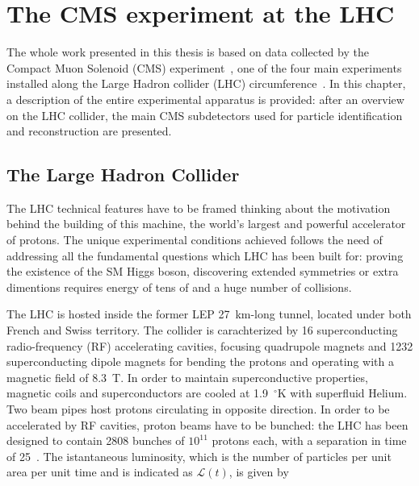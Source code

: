 \chapter{The CMS experiment at the LHC}
\label{ch:LHC-CMS}

The whole work presented in this thesis is based on data collected by the
Compact Muon Solenoid (CMS) experiment~\cite{Chatrchyan:2008aa}, one of the four main experiments
installed along the Large Hadron collider (LHC) circumference~\cite{Evans:2006tq}. In this chapter,
a description of the entire experimental apparatus is provided: after an overview
on the LHC collider, the main CMS subdetectors used for particle 
identification and reconstruction are presented. 

\section{The Large Hadron Collider}
\label{sec:LHC}

The LHC technical features have to be framed thinking about the motivation behind the
building of this machine, the world's largest and powerful accelerator of protons. 
The unique experimental conditions achieved follows the need of addressing all 
the fundamental questions which LHC has been built for: 
proving the existence of the SM Higgs boson, discovering extended symmetries
or extra dimentions requires energy of tens of \tev and a huge number of collisions.


The LHC is hosted inside the former LEP 27~\si{km}-long tunnel, located under both French and Swiss
territory. The collider is carachterized by 16 superconducting radio-frequency (RF) accelerating cavities, 
focusing quadrupole magnets and 1232 superconducting dipole magnets for bending the protons 
and operating with a magnetic field of 8.3~\si{T}. In order to maintain superconductive properties, 
magnetic coils and superconductors are cooled at 1.9~$^\circ$\si{K} with superfluid Helium. 
Two beam pipes host protons circulating in opposite direction.
In order to be accelerated by RF cavities, proton beams have to be bunched: 
the LHC has been designed to contain 2808 bunches of $10^{11}$ protons each, 
with a separation in time of 25~\ns. The istantaneous luminosity, which is the number 
of particles per unit area per unit time and is indicated as $\mathcal{L}(t)$, 
is given by~\cite{Bayatian:2006zz}

